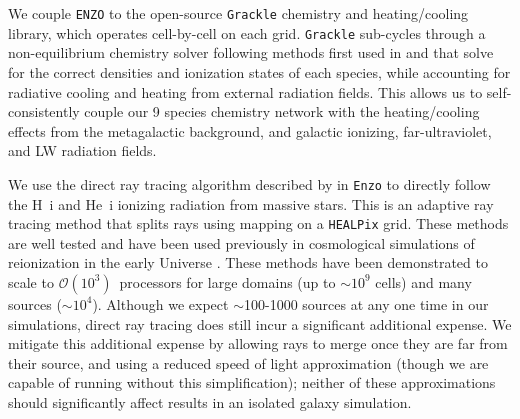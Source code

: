 \documentclass[11pt]{article}
\begin{document}
We couple \texttt{ENZO} to the open-source \texttt{Grackle} chemistry and heating/cooling library, which operates cell-by-cell on each grid. \texttt{Grackle} sub-cycles through a non-equilibrium chemistry solver following methods first used in \cite{Anninos1997} and \cite{Abel1997} that solve for the correct densities and ionization states of each species, while accounting for radiative cooling and heating from external radiation fields. This allows us to self-consistently couple our 9 species chemistry network with the heating/cooling effects from the metagalactic background, and galactic ionizing, far-ultraviolet, and LW radiation fields.


We use the direct ray tracing algorithm described by \cite{WiseAbel2011} in \texttt{Enzo} to directly follow the H~{\sc i} and He~{\sc i} ionizing radiation from massive stars. This is an adaptive ray tracing method that splits rays using mapping on a \texttt{HEALPix} grid. These methods are well tested and have been used previously in cosmological simulations of reionization in the early Universe \citep{Wise2012a, WiseAbel2012,Wise2014, Kim2013a, Kim2013b}. These methods have been demonstrated to scale to $\mathcal{O}(10^{3})$~processors for large domains (up to $\sim 10^9$ cells) and many sources ($\sim10^{4}$). Although we expect $\sim$100-1000 sources at any one time in our simulations, direct ray tracing does still incur a significant additional expense. We mitigate this additional expense by allowing rays to merge once they are far from their source, and using a reduced speed of light approximation (though we are capable of running without this simplification); neither of these approximations should significantly affect results in an isolated galaxy simulation. 
\end{document}
